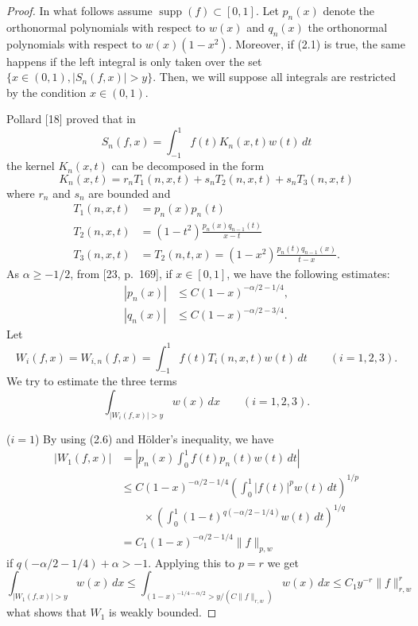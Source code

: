 \documentclass[10pt,a4paper]{article}
\newcommand{\supp}{\operatorname{supp}}
\theoremstyle{plain}
\theoremstyle{remark}
\begin{document}
\begin{proof}
In what follows assume $\supp(f) \subset [0,1]$.
Let $p_{n}(x)$ denote the orthonormal polynomials with respect to
$w(x)$ and $q_{n}(x)$ the orthonormal polynomials with respect to
$w(x)(1-x^{2})$. Moreover, if (2.1) is true, the same happens if
the left integral is only taken over the set
$\{ x \in (0,1), |S_{n}(f,x)| > y \}$. Then,
we will suppose all integrals are restricted by the condition
$x \in (0,1)$.

Pollard [18] proved that in
$$
S_{n}(f,x) = \int_{-1}^{1} f(t)K_{n}(x,t)w(t)\,dt
$$
the kernel $K_{n}(x,t)$ can be decomposed in the form
\begin{equation}
K_{n}(x,t) = r_{n}T_{1}(n,x,t) + s_{n}T_{2}(n,x,t) + s_{n}T_{3}(n,x,t)
\tag{2.2}
\end{equation}
where $r_{n}$ and $s_{n}$ are bounded and
\begin{align}
T_{1}(n,x,t) &= p_{n}(x)p_{n}(t)
\tag{2.3} \\
T_{2}(n,x,t) &= (1-t^{2}) \frac{p_{n}(x)q_{n-1}(t)}{x-t}
\tag{2.4} \\
T_{3}(n,x,t) &= T_{2}(n,t,x) = (1-x^{2}) \frac{p_{n}(t)q_{n-1}(x)}{t-x}.
\tag{2.5}
\end{align}
As $\alpha \geq -1/2$, from [23, p.~169], if $x \in [0,1]$,
we have the following estimates:
\begin{align}
|p_{n}(x)| &\leq C(1-x)^{-\alpha/2-1/4},
\tag{2.6} \\
|q_{n}(x)| &\leq C(1-x)^{-\alpha/2-3/4}.
\tag{2.7}
\end{align}
Let
$$
W_{i}(f,x) = W_{i,n}(f,x) = \int_{-1}^{1} f(t)T_{i}(n,x,t)w(t)\,dt
\qquad (i = 1, 2, 3).
$$
We try to estimate the three terms
$$
\int_{|W_{i}(f,x)| > y} w(x)\,dx
\qquad (i = 1, 2, 3).
$$

($i = 1$) By using (2.6) and H\"{o}lder's inequality, we have
\begin{align*}
|W_{1}(f,x)| &= \left| p_{n}(x) \int_{0}^{1} f(t)p_{n}(t)w(t)\,dt \right| \\
&\leq C(1-x)^{-\alpha/2-1/4}
\left(\int_{0}^{1} |f(t)|^{p}w(t)\,dt \right)^{1/p} \\
&\qquad\times \left( \int_{0}^{1} (1-t)^{q(-\alpha/2-1/4)} w(t)\,dt \right)^{1/q} \\
&= C_{1}(1-x)^{-\alpha/2-1/4} \|f\|_{p,w}
\end{align*}
if $q(-\alpha/2-1/4)+\alpha > -1$.
Applying this to $p = r$ we get
$$
\int_{|W_{1}(f,x)| > y} w(x)\,dx
\leq \int_{(1-x)^{-1/4-\alpha/2} > y/(C\|f\|_{r,w})} w(x)\,dx
\leq C_{1}y^{-r} \|f\|_{r,w}^{r}
$$
what shows that $W_{1}$ is weakly bounded.


\end{proof}
\end{document}
